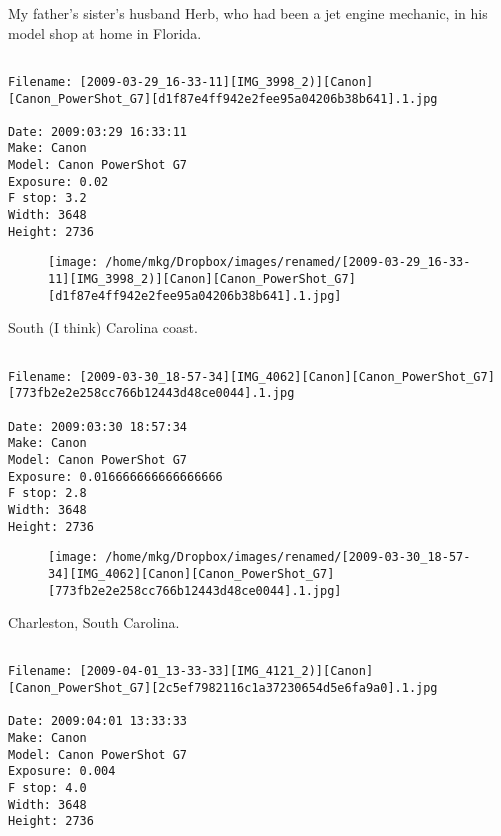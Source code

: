 \clearpage
\onecolumn
\noindent My father's sister's husband Herb, who had been a jet engine mechanic, in his model shop at home in Florida.
\noindent
\begin{lstlisting}

Filename: [2009-03-29_16-33-11][IMG_3998_2)][Canon][Canon_PowerShot_G7][d1f87e4ff942e2fee95a04206b38b641].1.jpg

Date: 2009:03:29 16:33:11
Make: Canon
Model: Canon PowerShot G7
Exposure: 0.02
F stop: 3.2
Width: 3648
Height: 2736
\end{lstlisting}
\clearpage

\begin{figure}
\texttt{[image: /home/mkg/Dropbox/images/renamed/[2009-03-29\_16-33-11][IMG\_3998\_2)][Canon][Canon\_PowerShot\_G7][d1f87e4ff942e2fee95a04206b38b641].1.jpg]}
\end{figure}
    
\clearpage
\onecolumn
\noindent South (I think) Carolina coast.
\noindent
\begin{lstlisting}

Filename: [2009-03-30_18-57-34][IMG_4062][Canon][Canon_PowerShot_G7][773fb2e2e258cc766b12443d48ce0044].1.jpg

Date: 2009:03:30 18:57:34
Make: Canon
Model: Canon PowerShot G7
Exposure: 0.016666666666666666
F stop: 2.8
Width: 3648
Height: 2736
\end{lstlisting}
\clearpage

\begin{figure}
\texttt{[image: /home/mkg/Dropbox/images/renamed/[2009-03-30\_18-57-34][IMG\_4062][Canon][Canon\_PowerShot\_G7][773fb2e2e258cc766b12443d48ce0044].1.jpg]}
\end{figure}
    
\clearpage
\onecolumn
\noindent Charleston, South Carolina.
\noindent
\begin{lstlisting}

Filename: [2009-04-01_13-33-33][IMG_4121_2)][Canon][Canon_PowerShot_G7][2c5ef7982116c1a37230654d5e6fa9a0].1.jpg

Date: 2009:04:01 13:33:33
Make: Canon
Model: Canon PowerShot G7
Exposure: 0.004
F stop: 4.0
Width: 3648
Height: 2736
\end{lstlisting}
\clearpage

